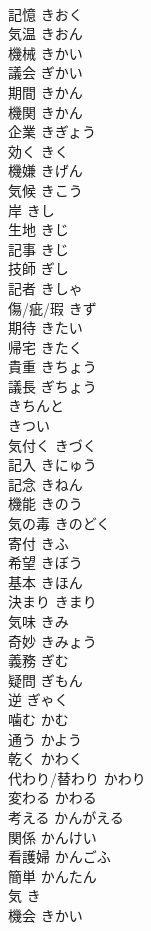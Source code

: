\documentclass[8pt]{extreport}
\begin{document}
\begin{CJK}{UTF8}{min}
\\	記憶	きおく	
\\	気温	きおん	
\\	機械	きかい	
\\	議会	ぎかい	
\\	期間	きかん	
\\	機関	きかん	
\\	企業	きぎょう	
\\	効く	きく	
\\	機嫌	きげん	
\\	気候	きこう	
\\	岸	きし	
\\	生地	きじ	
\\	記事	きじ	
\\	技師	ぎし	
\\	記者	きしゃ	
\\	傷/疵/瑕	きず	
\\	期待	きたい	
\\	帰宅	きたく	
\\	貴重	きちょう	
\\	議長	ぎちょう	
\\	きちんと		
\\	きつい		
\\	気付く	きづく	
\\	記入	きにゅう	
\\	記念	きねん	
\\	機能	きのう	
\\	気の毒	きのどく	
\\	寄付	きふ	
\\	希望	きぼう	
\\	基本	きほん	
\\	決まり	きまり	
\\	気味	きみ	
\\	奇妙	きみょう	
\\	義務	ぎむ	
\\	疑問	ぎもん	
\\	逆	ぎゃく	
\\	噛む	かむ	
\\	通う	かよう	
\\	乾く	かわく	
\\	代わり/替わり	かわり	
\\	変わる	かわる	
\\	考える	かんがえる	
\\	関係	かんけい	
\\	看護婦	かんごふ	
\\	簡単	かんたん	
\\	気	き	
\\	機会	きかい	

\end{CJK}
\end{document}
